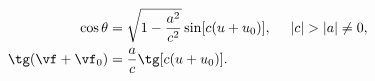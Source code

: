\begin{equation*}
\begin{split}
  \cos\theta&=\sqrt{1-\frac{a^2}{c^2}}\sin[c(u+u_0)],~~~~|c|>|a|\ne0,
\\
  \tg(\vf+\vf_0)&=\frac ac\tg[c(u+u_0)].
\end{split}
\end{equation*}

